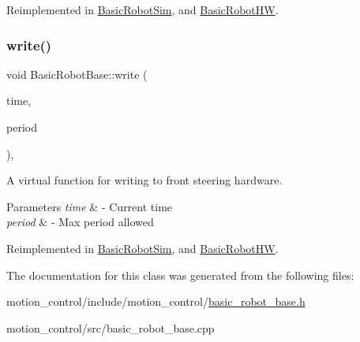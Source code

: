 Reimplemented in \hyperlink{classBasicRobotSim_a074eed2efbdc51b211f62ac668706237}{Basic\+Robot\+Sim}, and \hyperlink{classBasicRobotHW_a65df70e5ed1bda01e062977d07429f9a}{Basic\+Robot\+HW}.

\mbox{\label{classBasicRobotBase_afbc6ef4347fc05e053391692a9e1bc24}} 
\subsubsection{\texorpdfstring{write()}{write()}}
{\footnotesize\ttfamily void Basic\+Robot\+Base\+::write (\begin{DoxyParamCaption}\item[{const ros\+::\+Time \&}]{time,  }\item[{const ros\+::\+Duration \&}]{period }\end{DoxyParamCaption})\hspace{0.3cm}{\ttfamily [override]}, {\ttfamily [virtual]}}



A virtual function for writing to front steering hardware. 


\begin{DoxyParams}{Parameters}
{\em time} & -\/ Current time \\
\hline
{\em period} & -\/ Max period allowed \\
\hline
\end{DoxyParams}


Reimplemented in \hyperlink{classBasicRobotSim_a0efb3d3e006cd5c233e2e273d89e06f6}{Basic\+Robot\+Sim}, and \hyperlink{classBasicRobotHW_ad98c52f214593f8d59b1df93b1155c74}{Basic\+Robot\+HW}.



The documentation for this class was generated from the following files\+:\begin{DoxyCompactItemize}
\item 
motion\+\_\+control/include/motion\+\_\+control/\hyperlink{basic__robot__base_8h}{basic\+\_\+robot\+\_\+base.\+h}\item 
motion\+\_\+control/src/basic\+\_\+robot\+\_\+base.\+cpp\end{DoxyCompactItemize}
